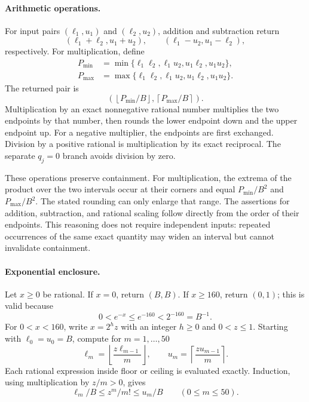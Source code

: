 \documentclass[11pt,letterpaper]{article}
\begin{document}
\paragraph{Arithmetic operations.}
For input pairs $(\ell_1,u_1)$ and $(\ell_2,u_2)$, addition and subtraction
return
\[
 (\ell_1+\ell_2,u_1+u_2),\qquad
 (\ell_1-u_2,u_1-\ell_2),
\]
respectively. For multiplication, define
\begin{align*}
 P_{\min}&=\min\{\ell_1\ell_2,\ell_1u_2,u_1\ell_2,u_1u_2\},\\
 P_{\max}&=\max\{\ell_1\ell_2,\ell_1u_2,u_1\ell_2,u_1u_2\}.
\end{align*}
The returned pair is
\[
 \left(\left\lfloor P_{\min}/B\right\rfloor,
       \left\lceil P_{\max}/B\right\rceil\right).
\]
Multiplication by an exact nonnegative rational number multiplies the
two endpoints by that number, then rounds the lower endpoint down and
the upper endpoint up. For a negative multiplier, the endpoints are
first exchanged. Division by a positive rational is multiplication by
its exact reciprocal. The separate $q_j=0$ branch avoids division by zero.

These operations preserve containment. For multiplication, the extrema
of the product over the two intervals occur at their corners and equal
$P_{\min}/B^2$ and $P_{\max}/B^2$. The stated rounding can only enlarge
that range. The assertions for addition, subtraction, and rational
scaling follow directly from the order of their endpoints. This reasoning
does not require independent inputs: repeated occurrences of the same
exact quantity may widen an interval but cannot invalidate containment.

\paragraph{Exponential enclosure.}
Let $x\ge0$ be rational. If $x=0$, return $(B,B)$. If $x\ge160$,
return $(0,1)$; this is valid because
\[
 0<e^{-x}\le e^{-160}<2^{-160}=B^{-1}.
\]
For $0<x<160$, write $x=2^h z$ with an integer $h\ge0$ and $0<z\le1$.
Starting with $\ell_0=u_0=B$, compute for $m=1,\ldots,50$
\[
 \ell_m=\left\lfloor\frac{z\ell_{m-1}}m\right\rfloor,
 \qquad
 u_m=\left\lceil\frac{zu_{m-1}}m\right\rceil.
\]
Each rational expression inside floor or ceiling is evaluated exactly.
Induction, using multiplication by $z/m>0$, gives
\[
 \ell_m/B\le z^m/m!\le u_m/B\qquad(0\le m\le50).
\]
\end{document}
